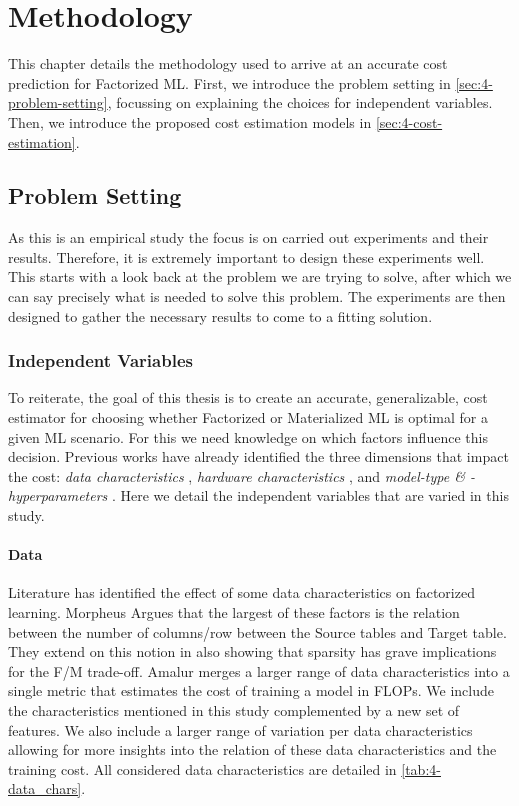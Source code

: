 
\chapter{Methodology}

\label{chapter:methodology}

This chapter details the methodology used to arrive at an accurate cost prediction for Factorized ML. First, we introduce the problem setting in \autoref{sec:4-problem-setting}, focussing on explaining the choices for independent variables. Then, we introduce the proposed cost estimation models in \autoref{sec:4-cost-estimation}.

\section{Problem Setting}
\label{sec:4-problem-setting}

As this is an empirical study the focus is on carried out experiments and their results. Therefore, it is extremely important to design these experiments well. This starts with a look back at the problem we are trying to solve, after which we can say precisely what is needed to solve this problem. The experiments are then designed to gather the necessary results to come to a fitting solution.

\subsection{Independent Variables}
To reiterate, the goal of this thesis is to create an accurate, generalizable, cost estimator for choosing whether Factorized or Materialized ML is optimal for a given ML scenario. For this we need knowledge on which factors influence this decision. Previous works have already identified the three dimensions that impact the cost: \emph{data characteristics} \cite{morpheus, amalur,schijndel_cost_estimation}, \emph{hardware characteristics} \cite{orion_learning_gen_lin_models}, and \emph{model-type \& -hyperparameters} \cite{amalur,schijndel_cost_estimation}. Here we detail the independent variables that are varied in this study.

\subsubsection{Data}
Literature has identified the effect of some data characteristics on factorized learning. Morpheus \cite{morpheus} Argues that the largest of these factors is the relation between the number of columns/row between the Source tables and Target table. They extend on this notion in \cite{MorpheusFI} also showing that sparsity has grave implications for the F/M trade-off. Amalur \cite{amalur} merges a larger range of data characteristics into a single metric that estimates the cost of training a model in FLOPs. We include the characteristics mentioned in this study complemented by a new set of features. We also include a larger range of variation per data characteristics allowing for more insights into the relation of these data characteristics and the training cost. All considered data characteristics are detailed in \autoref{tab:4-data_chars}.

